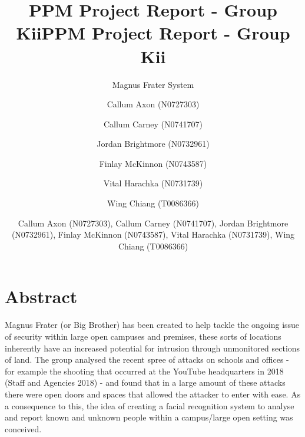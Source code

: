 \documentclass[
  english,
  a4paper,
,tablecaptionabove
]{scrartcl}
\title{PPM Project Report - Group Kii}
\subtitle{Magnus Frater System}
\author{Callum Axon (N0727303) \and Callum Carney (N0741707) \and Jordan Brightmore (N0732961) \and Finlay McKinnon (N0743587) \and Vital Harachka (N0731739) \and Wing Chiang (T0086366)}
\date{}
\title{PPM Project Report - Group Kii}
\author{Callum Axon (N0727303), Callum Carney (N0741707), Jordan Brightmore (N0732961), Finlay McKinnon (N0743587), Vital Harachka (N0731739), Wing Chiang (T0086366)}
\begin{document}

\begin{titlepage}
\afterpage{\restorepagecolor}
\newcommand{\colorRule}[3][black]{\textcolor[HTML]{#1}{\rule{#2}{#3}}}
\end{titlepage}
\restoregeometry




\hypertarget{abstract}{%
\section{Abstract}\label{abstract}}

Magnus Frater (or Big Brother) has been created to help tackle the
ongoing issue of security within large open campuses and premises, these
sorts of locations inherently have an increased potential for intrusion
through unmonitored sections of land. The group analysed the recent
spree of attacks on schools and offices - for example the shooting that
occurred at the YouTube headquarters in 2018 (Staff and Agencies 2018) -
and found that in a large amount of these attacks there were open doors
and spaces that allowed the attacker to enter with ease. As a
consequence to this, the idea of creating a facial recognition system to
analyse and report known and unknown people within a campus/large open
setting was conceived.
\end{document}
